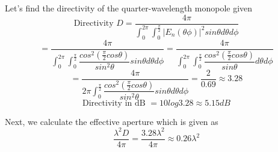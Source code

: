 Let's find the directivity of the quarter-wavelength monopole given 
\[ \text{Directivity }D = \dfrac{4\pi}{\int_{0}^{2\pi}\int_{0}^{\frac{\pi}{2}}|E_n(\theta\phi)|^2sin\theta d\theta d\phi} \]
\[ = \dfrac{4\pi}{\int_{0}^{2\pi}\int_{0}^{\frac{\pi}{2}}\dfrac{cos^2(\frac{\pi}{2}cos\theta)}{sin^2\theta}sin\theta d\theta d\phi} = \dfrac{4\pi}{\int_{0}^{2\pi}\int_{0}^{\frac{\pi}{2}}\dfrac{cos^2(\frac{\pi}{2}cos\theta)}{sin\theta} d\theta d\phi} \]
\[ = \dfrac{4\pi}{2\pi\int_{0}^{\frac{\pi}{2}}\dfrac{cos^2(\frac{\pi}{2}cos\theta)}{sin^2\theta}sin\theta d\theta d\phi} = \dfrac{2}{0.69} \approx 3.28 \]
\[ \text{Directivity in dB } = 10log3.28 \approx 5.15dB \]

Next, we calculate the effective aperture which is given as 
\[ \dfrac{\lambda^2 D}{4\pi} = \dfrac{3.28\lambda^2}{4\pi} \approx 0.26\lambda^2 \]

